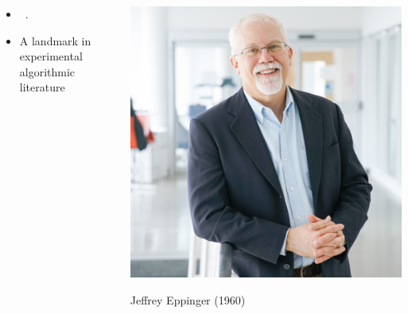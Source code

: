\documentclass{beamer}
\begin{document}
\begin{frame}
    \begin{columns}[c]
        \begin{column}{0.5\textwidth}
            \begin{itemize}
                \item ~.
                \item A landmark in experimental algorithmic literature
            \end{itemize}
        \end{column}
        \begin{column}{0.5\textwidth}
            \includegraphics[width=\textwidth]{eppinger.jpg}
            \begin{center}
                Jeffrey Eppinger (1960)
            \end{center}
        \end{column}
    \end{columns}
\end{frame}
\end{document}
